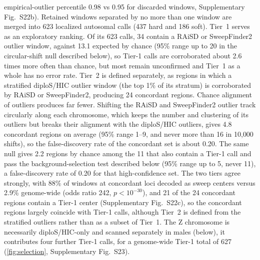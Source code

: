 \documentclass[11pt]{article}
\begin{document}
empirical-outlier percentile 0.98 vs 0.95 for discarded windows, Supplementary Fig.~S22b). Retained windows separated
by no more than one window are merged into 623 localized autosomal calls (437 hard and 186 soft). Tier~1 serves as an exploratory ranking. Of its 623 calls, 34 contain a RAiSD or SweepFinder2 outlier window, against 13.1 expected by chance (95\% range up to 20 in the circular-shift null described below), so Tier-1 calls are corroborated about 2.6 times more often than chance, but most remain unconfirmed and Tier~1 as a whole has no error rate. Tier~2 is defined separately, as regions in which a stratified diploS/HIC outlier window (the top 1\% of its stratum) is corroborated by RAiSD or SweepFinder2, producing 24 concordant regions. Chance alignment of outliers produces far fewer. Shifting the RAiSD and SweepFinder2
outlier track circularly along each chromosome, which keeps the number and clustering of its outliers but breaks
their alignment with the diploS/HIC outliers, gives 4.8 concordant regions on average (95\% range 1--9, and never
more than 16 in 10{,}000 shifts), so the false-discovery rate of the concordant set is about 0.20. The same null gives 2.2 regions by chance among the 11 that also contain a Tier-1 call and pass the background-selection test described below (95\% range up to 5, never 11), a false-discovery rate of 0.20 for that high-confidence set. The two tiers agree strongly, with 88\% of windows at concordant loci decoded as sweep centers 
versus 2.9\% genome-wide (odds ratio 242, $p<10^{-30}$), and 21 of the 24 concordant
regions contain a Tier-1 center (Supplementary Fig.~S22c), so the concordant regions largely coincide with Tier-1 calls, although Tier~2 is defined from the stratified outliers rather than as a subset of Tier~1. The Z chromosome is necessarily diploS/HIC-only
and scanned separately in males (below), it contributes four further Tier-1 calls, for a genome-wide 
Tier-1 total of 627 (\cref{fig:selection}, Supplementary Fig.~S23).
\end{document}
